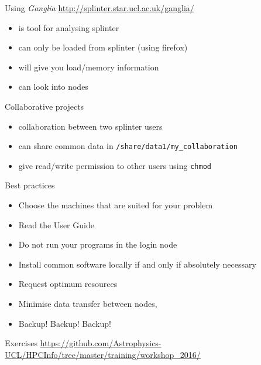 \documentclass{beamer}
\begin{document}
\begin{frame}{Using \emph{Ganglia}}
	\url{http://splinter.star.ucl.ac.uk/ganglia/}

	\begin{itemize}
		\item is tool for analysing splinter
		\item can only be loaded from splinter (using firefox)
		\item will give you load/memory information
		\item can look into nodes
	\end{itemize}
\end{frame}

\begin{frame}{Collaborative projects}
	\begin{itemize}
		\item collaboration between two splinter users
		\item can share common data in \texttt{/share/data1/my\_collaboration}
		\item give read/write permission to other users using \texttt{chmod}
	\end{itemize}
\end{frame}


\begin{frame}{Best practices}
  \begin{itemize}
    \item Choose the machines that are suited for your problem
    \item Read the User Guide
    \item Do not run your programs in the login node
    \item Install common software locally if and only if absolutely necessary
    \item Request optimum resources
    \item Minimise data transfer between nodes,
    \item \alert{Backup! Backup! Backup!}
  \end{itemize}
\end{frame}

\begin{frame}{Exercises}
	\url{https://github.com/Astrophysics-UCL/HPCInfo/tree/master/training/workshop_2016/}
\end{frame}
\end{document}
